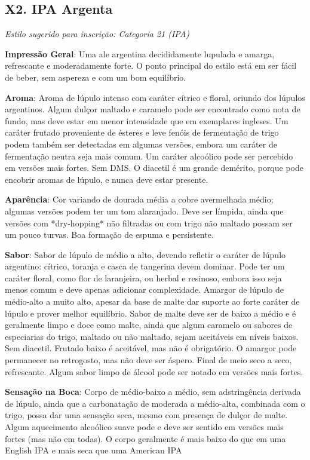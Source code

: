\subsection*{X2. IPA Argenta}

\textit{Estilo sugerido para inscrição: Categoria 21 (IPA)}

\textbf{Impressão Geral}: Uma ale argentina decididamente lupulada e amarga, refrescante e moderadamente forte. O ponto principal do estilo está em ser fácil de beber, sem aspereza e com um bom equilíbrio.

\textbf{Aroma}: Aroma de lúpulo intenso com caráter cítrico e floral, oriundo dos lúpulos argentinos. Algum dulçor maltado e caramelo pode ser encontrado como nota de fundo, mas deve estar em menor intensidade que em exemplares ingleses. Um caráter frutado proveniente de ésteres e leve fenóis de fermentação de trigo podem também ser detectadas em algumas versões, embora um caráter de fermentação neutra seja mais comum. Um caráter alcoólico pode ser percebido em versões mais fortes. Sem DMS. O diacetil é um grande demérito, porque pode encobrir aromas de lúpulo, e nunca deve estar presente.

\textbf{Aparência}: Cor variando de dourada média a cobre avermelhada médio; algumas versões podem ter um tom alaranjado. Deve ser límpida, ainda que versões com *dry-hopping* não filtradas ou com trigo não maltado possam ser um pouco turvas. Boa formação de espuma e persistente.

\textbf{Sabor}: Sabor de lúpulo de médio a alto, devendo refletir o caráter de lúpulo argentino: cítrico, toranja e casca de tangerina devem dominar. Pode ter um caráter floral, como flor de laranjeira, ou herbal e resinoso, embora isso seja menos comum e deve apenas adicionar complexidade. Amargor de lúpulo de médio-alto a muito alto, apesar da base de malte dar suporte ao forte caráter de lúpulo e prover melhor equilíbrio. Sabor de malte deve ser de baixo a médio e é geralmente limpo e doce como malte, ainda que algum caramelo ou sabores de especiarias do trigo, maltado ou não maltado, sejam aceitáveis em níveis baixos. Sem diacetil. Frutado baixo é aceitável, mas não é obrigatório. O amargor pode permanecer no retrogosto, mas não deve ser áspero. Final de meio seco a seco, refrescante. Algum sabor limpo de álcool pode ser notado em versões mais fortes.

\textbf{Sensação na Boca}: Corpo de médio-baixo a médio, sem adstringência derivada de lúpulo, ainda que a carbonatação de moderada a médio-alta, combinada com o trigo, possa dar uma sensação seca, mesmo com presença de dulçor de malte. Algum aquecimento alcoólico suave pode e deve ser sentido em versões mais fortes (mas não em todas). O corpo geralmente é mais baixo do que em uma English IPA e mais seca que uma American IPA


